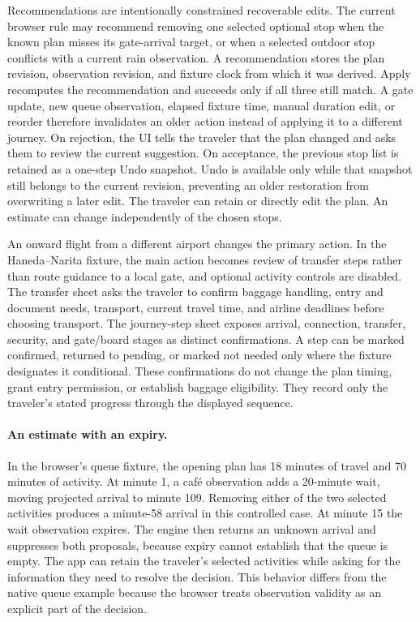 \documentclass[sigconf,nonacm,balance=false]{acmart}
\begin{document}
Recommendations are intentionally constrained recoverable edits.  The current
browser rule may recommend removing one selected optional stop when the known
plan misses its gate-arrival target, or when a selected outdoor stop conflicts
with a current rain observation.  A recommendation stores the plan revision,
observation revision, and fixture clock from which it was derived.  Apply
recomputes the recommendation and succeeds only if all three still match.  A
gate update, new queue observation, elapsed fixture time, manual duration edit,
or reorder therefore invalidates an older action instead of applying it to a
different journey.  On rejection, the UI tells the traveler that the plan
changed and asks them to review the current suggestion.  On acceptance, the
previous stop list is retained as a one-step Undo snapshot.  Undo is available
only while that snapshot still belongs to the current revision, preventing an
older restoration from overwriting a later edit.  The traveler can retain or directly edit the plan. An estimate can change independently of the chosen stops.

An onward flight from a different airport changes the primary action.  In the
Haneda--Narita fixture, the main action becomes review of transfer steps rather
than route guidance to a local gate, and optional activity controls are disabled.
The transfer sheet asks the traveler to confirm baggage handling, entry and
document needs, transport, current travel time, and airline deadlines before
choosing transport.  The journey-step sheet exposes arrival, connection,
transfer, security, and gate/board stages as distinct confirmations.  A step
can be marked confirmed, returned to pending, or marked not needed only where
the fixture designates it conditional.  These confirmations do not change the
plan timing, grant entry permission, or establish baggage eligibility.  They
record only the traveler's stated progress through the displayed sequence.

\paragraph{An estimate with an expiry.}
In the browser's queue fixture, the opening plan has 18 minutes of travel and 70 minutes of activity. At minute 1, a caf\'e observation adds a 20-minute wait, moving projected arrival to minute 109. Removing either of the two selected activities produces a minute-58 arrival in this controlled case. At minute 15 the wait observation expires. The engine then returns an unknown arrival and suppresses both proposals, because expiry cannot establish that the queue is empty. The app can retain the traveler's selected activities while asking for the information they need to resolve the decision. This behavior differs from the native queue example because the browser treats observation validity as an explicit part of the decision.
\end{document}

